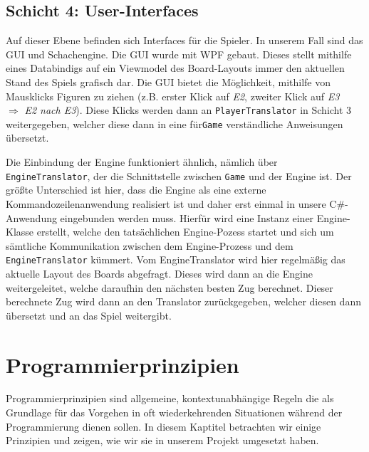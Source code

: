 \documentclass[
10pt, %
a4paper, %
oneside, %
headinclude,footinclude, %
BCOR5mm, %
]{scrartcl}
\begin{document}
\begin{onehalfspace}
\subsection{Schicht 4: User-Interfaces}
Auf dieser Ebene befinden sich Interfaces für die Spieler. In unserem Fall sind das GUI und Schachengine. Die GUI wurde mit WPF gebaut. Dieses stellt mithilfe eines Databindigs auf ein Viewmodel des Board-Layouts immer den aktuellen Stand des Spiels grafisch dar. 
Die GUI bietet die Möglichkeit, mithilfe von Mausklicks Figuren zu ziehen (z.B. erster Klick auf \textit{E2}, zweiter Klick auf \textit{E3}~~ $\Rightarrow$ \textit{E2 nach E3}). Diese Klicks werden dann an \texttt{PlayerTranslator} in Schicht 3 weitergegeben, welcher diese dann in eine für\texttt{Game} verständliche Anweisungen übersetzt.

Die Einbindung der Engine funktioniert ähnlich, nämlich über \texttt{EngineTranslator}, der die Schnittstelle zwischen \texttt{Game} und der Engine ist. Der größte Unterschied ist hier, dass die Engine als eine externe Kommandozeilenanwendung realisiert ist und daher erst einmal in unsere C\#-Anwendung eingebunden werden muss.
Hierfür wird eine Instanz einer Engine-Klasse erstellt, welche den tatsächlichen Engine-Pozess startet und sich um sämtliche Kommunikation zwischen dem Engine-Prozess und dem \texttt{EngineTranslator} kümmert. Vom EngineTranslator wird hier regelmäßig das aktuelle Layout des Boards abgefragt. Dieses wird dann an die Engine weitergeleitet, welche daraufhin den nächsten besten Zug berechnet. Dieser berechnete Zug wird dann an den Translator zurückgegeben, welcher diesen dann übersetzt und an das Spiel weitergibt.
\newpage
\section{Programmierprinzipien}
Programmierprinzipien sind allgemeine, kontextunabhängige Regeln die als Grundlage für das Vorgehen in oft wiederkehrenden Situationen während der Programmierung dienen sollen.
In diesem Kaptitel betrachten wir einige Prinzipien und zeigen, wie wir sie in unserem Projekt umgesetzt haben.

\end{onehalfspace}
\end{document}
